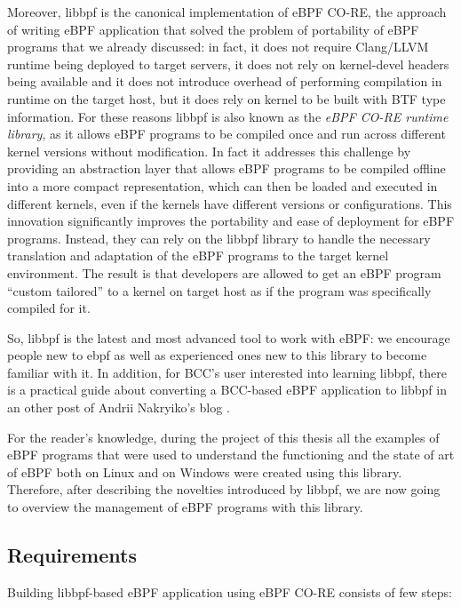 Moreover, libbpf is the canonical implementation of eBPF CO-RE, the approach of writing eBPF application that solved the problem of portability of eBPF programs that we already discussed: in fact, it does not require Clang/LLVM runtime being deployed to target servers, it does not rely on kernel-devel headers being available and it does not introduce overhead of performing compilation in runtime on the target host, but it does rely on kernel to be built with BTF type information.
For these reasons libbpf is also known as the \textit{eBPF CO-RE runtime library}, as it allows eBPF programs to be compiled once and run across different kernel versions without modification.
In fact it addresses this challenge by providing an abstraction layer that allows eBPF programs to be compiled offline into a more compact representation, which can then be loaded and executed in different kernels, even if the kernels have different versions or configurations.
This innovation significantly improves the portability and ease of deployment for eBPF programs.
Instead, they can rely on the libbpf library to handle the necessary translation and adaptation of the eBPF programs to the target kernel environment.
The result is that developers are allowed to get an eBPF program ``custom tailored'' to a kernel on target host as if the program was specifically compiled for it.

So, libbpf is the latest and most advanced tool to work with eBPF: we encourage people new to ebpf as well as experienced ones new to this library to become familiar with it.
In addition, for BCC's user interested into learning libbpf, there is a practical guide about converting a BCC-based eBPF application to libbpf in an other post of Andrii Nakryiko's blog \cite{BCCTolibbpfGuide}.

For the reader's knowledge, during the project of this thesis all the examples of eBPF programs that were used to understand the functioning and the state of art of eBPF both on Linux and on Windows were created using this library.
Therefore, after describing the novelties introduced by libbpf, we are now going to overview the management of eBPF programs with this library.

\subsection{Requirements}

Building libbpf-based eBPF application using eBPF CO-RE consists of few steps:

